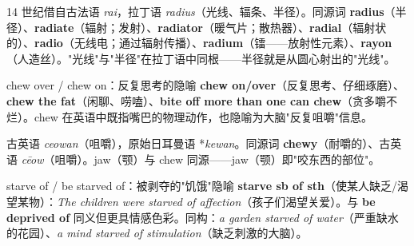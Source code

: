 \documentclass[../main.tex]{subfiles}
\begin{document}
\begin{origin}
14 世纪借自古法语 \textit{rai}，拉丁语 \textit{radius}（光线、辐条、半径）。同源词 \textbf{radius}（半径）、\textbf{radiate}（辐射；发射）、\textbf{radiator}（暖气片；散热器）、\textbf{radial}（辐射状的）、\textbf{radio}（无线电；通过辐射传播）、\textbf{radium}（镭——放射性元素）、\textbf{rayon}（人造丝）。"光线"与"半径"在拉丁语中同根——半径就是从圆心射出的"光线"。
\end{origin}




\begin{gram}{chew over / chew on：反复思考的隐喻}
\textbf{chew on/over}（反复思考、仔细琢磨）、\textbf{chew the fat}（闲聊、唠嗑）、\textbf{bite off more than one can chew}（贪多嚼不烂）。chew 在英语中既指嘴巴的物理动作，也隐喻为大脑"反复咀嚼"信息。
\end{gram}

\begin{origin}
古英语 \textit{ceowan}（咀嚼），原始日耳曼语 *\textit{kewan}。同源词 \textbf{chewy}（耐嚼的）、古英语 \textit{cēow}（咀嚼）。jaw（颚）与 chew 同源——jaw（颚）即"咬东西的部位"。
\end{origin}




\begin{gram}{starve of / be starved of：被剥夺的"饥饿"隐喻}
\textbf{starve sb of sth}（使某人缺乏/渴望某物）：\textit{The children were starved of affection}（孩子们渴望关爱）。与 \textbf{be deprived of} 同义但更具情感色彩。同构：\textit{a garden starved of water}（严重缺水的花园）、\textit{a mind starved of stimulation}（缺乏刺激的大脑）。
\end{gram}
\end{document}
